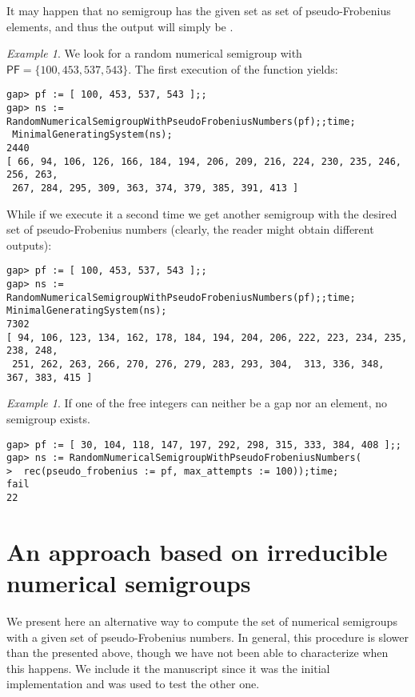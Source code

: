 \documentclass[11pt]{amsart}
\theoremstyle{remark}
\newtheorem{example}[theorem]{Example}
\begin{document}
It may happen that no semigroup has the given set as set of pseudo-Frobenius elements, and thus the output will simply be \fail.
\begin{example}\label{example:random1}
We look for a random numerical semigroup with ${\ensuremath{\mathsf{PF}}}=\{100,453,537,543\}$. The first execution of the function yields:
\begin{verbatim}
gap> pf := [ 100, 453, 537, 543 ];;
gap> ns := RandomNumericalSemigroupWithPseudoFrobeniusNumbers(pf);;time;
 MinimalGeneratingSystem(ns);
2440
[ 66, 94, 106, 126, 166, 184, 194, 206, 209, 216, 224, 230, 235, 246, 256, 263,
 267, 284, 295, 309, 363, 374, 379, 385, 391, 413 ]
\end{verbatim}
While if we execute it a second time we get another semigroup with the desired set of pseudo-Frobenius numbers (clearly, the reader might obtain different outputs):
\begin{verbatim}
gap> pf := [ 100, 453, 537, 543 ];;
gap> ns := RandomNumericalSemigroupWithPseudoFrobeniusNumbers(pf);;time; 
MinimalGeneratingSystem(ns);
7302
[ 94, 106, 123, 134, 162, 178, 184, 194, 204, 206, 222, 223, 234, 235, 238, 248,
 251, 262, 263, 266, 270, 276, 279, 283, 293, 304,  313, 336, 348, 367, 383, 415 ]
\end{verbatim}
\end{example}
\begin{example}\label{example:random2}
If one of the free integers can neither be a gap nor an element, no semigroup exists.
\begin{verbatim}
gap> pf := [ 30, 104, 118, 147, 197, 292, 298, 315, 333, 384, 408 ];;
gap> ns := RandomNumericalSemigroupWithPseudoFrobeniusNumbers(       
>  rec(pseudo_frobenius := pf, max_attempts := 100));time;        
fail
22
\end{verbatim}
\end{example}
\appendix
\section{An approach based on irreducible numerical semigroups}
\label{sec:computing_arbitrary_type}

We present here an alternative way to compute the set of numerical semigroups with a given set of pseudo-Frobenius numbers. In general, this procedure is slower than the presented above, though we have not been able to characterize when this happens. We include it the manuscript since it was the initial implementation and was used to test the other one.
\end{document}
